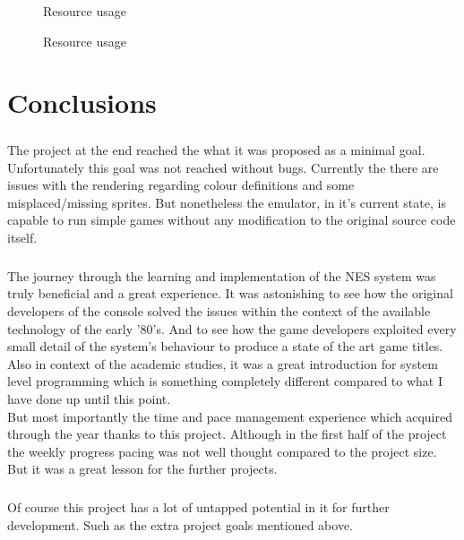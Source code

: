 \documentclass[]{report}
\begin{document}
 \begin{figure}[!htb]
	\caption{\label{fig:my-label} Resource usage}
\end{figure}
\begin{figure}[!htb]
	\caption{\label{fig:my-label} Resource usage}
\end{figure}
\clearpage

\chapter{Conclusions}
\paragraph{ }
The project at the end reached the what it was proposed as a minimal goal. Unfortunately this goal was not reached without bugs. Currently the there are issues with the rendering regarding colour definitions and some misplaced/missing sprites. But nonetheless the emulator, in it's current state, is capable to run simple games without any modification to the original source code itself.

\paragraph{ }
The journey through the learning and implementation of the NES system was truly beneficial and a great experience. It was astonishing to see how the original developers of the console solved the issues within the context of the available technology of the early '80's. And to see how the game developers exploited every small detail of the system's behaviour to produce a state of the art game titles. Also in context of the academic studies, it was a great introduction for system level programming which is something completely different compared to what I have done up until this point.
\\
But most importantly the  time and pace management experience which acquired through the year thanks to this project. Although in the first half of the project the weekly progress pacing was not well thought compared to the project size. But it was a great lesson for the further projects. 

\paragraph{ }
Of course this project has a lot of untapped potential in it for further development. Such as the extra project goals mentioned above.

\printbibliography
\end{document}
